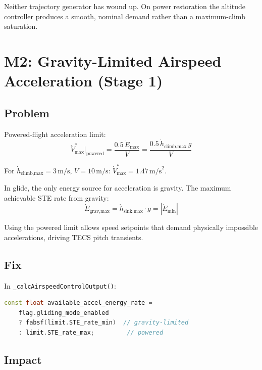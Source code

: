 \documentclass[12pt,a4paper]{article}
\begin{document}
Neither trajectory generator has wound up. On power restoration the
altitude controller produces a smooth, nominal demand rather than a
maximum-climb saturation.

\section{M2: Gravity-Limited Airspeed Acceleration (Stage 1)}

\subsection{Problem}

Powered-flight acceleration limit:
\begin{equation}
  \dot{V}^*_{\max}\big|_{\text{powered}} = \frac{0.5\,\dot{E}_{\max}}{V}
  = \frac{0.5\,\dot{h}_{\text{climb,max}}\,g}{V}
\end{equation}

For $\dot{h}_{\text{climb,max}} = 3\,\text{m/s}$, $V = 10\,\text{m/s}$:
$\dot{V}^*_{\max} = 1.47\,\text{m/s}^2$.

In glide, the only energy source for acceleration is gravity.
The maximum achievable STE rate from gravity:
\begin{equation}
  \dot{E}_{\text{grav,max}} = \dot{h}_{\text{sink,max}} \cdot g = |\dot{E}_{\min}|
\end{equation}

Using the powered limit allows speed setpoints that demand physically
impossible accelerations, driving TECS pitch transients.

\subsection{Fix}

In \texttt{\_calcAirspeedControlOutput()}:

\begin{lstlisting}[language=C++]
const float available_accel_energy_rate =
    flag.gliding_mode_enabled
    ? fabsf(limit.STE_rate_min)  // gravity-limited
    : limit.STE_rate_max;         // powered
\end{lstlisting}

\subsection{Impact}
\end{document}
